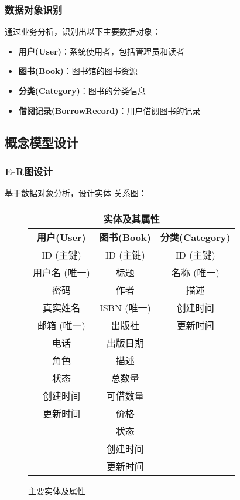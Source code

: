 \documentclass[12pt,a4paper]{article}
\begin{document}
\subsubsection{数据对象识别}
通过业务分析，识别出以下主要数据对象：

\begin{itemize}
    \item \textbf{用户(User)}：系统使用者，包括管理员和读者
    \item \textbf{图书(Book)}：图书馆的图书资源
    \item \textbf{分类(Category)}：图书的分类信息
    \item \textbf{借阅记录(BorrowRecord)}：用户借阅图书的记录
\end{itemize}

\subsection{概念模型设计}

\subsubsection{E-R图设计}
基于数据对象分析，设计实体-关系图：

\begin{figure}[H]
\centering
\begin{tabular}{|c|c|c|}
\hline
\multicolumn{3}{|c|}{\textbf{实体及其属性}} \\
\hline
\textbf{用户(User)} & \textbf{图书(Book)} & \textbf{分类(Category)} \\
\hline
ID (主键) & ID (主键) & ID (主键) \\
用户名 (唯一) & 标题 & 名称 (唯一) \\
密码 & 作者 & 描述 \\
真实姓名 & ISBN (唯一) & 创建时间 \\
邮箱 (唯一) & 出版社 & 更新时间 \\
电话 & 出版日期 & \\
角色 & 描述 & \\
状态 & 总数量 & \\
创建时间 & 可借数量 & \\
更新时间 & 价格 & \\
& 状态 & \\
& 创建时间 & \\
& 更新时间 & \\
\hline
\end{tabular}
\caption{主要实体及属性}
\end{figure}
\end{document}
